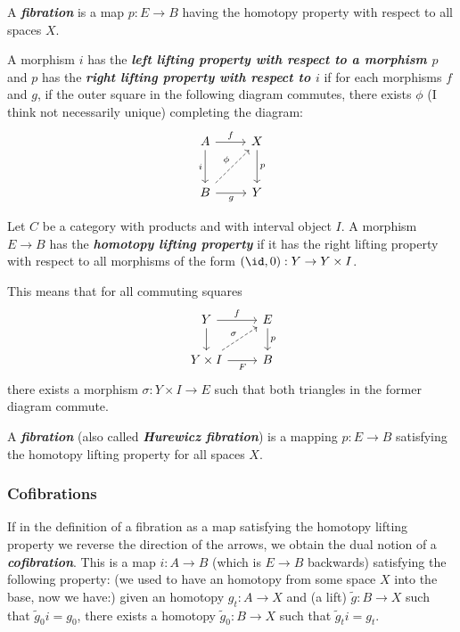 \begin{remark}
\begin{defn}[Hatcher]
	A \textbf{\textit{fibration}} is a map $p:E\to B$ having the homotopy property with respect to all spaces $X$.
\end{defn}

\begin{defn}
	A morphism $i$ has the \textbf{\textit{left lifting property with respect to a morphism $p$}} and $p$ has the \textbf{\textit{right lifting property with respect to $i$}} if for each morphisms $f$ and $g$, if the outer square in the following diagram commutes, there exists $\phi$ (I think not necessarily unique) completing the diagram:
	\[\begin{tikzcd}[row sep=large]
		A\arrow[r,"f"]\arrow[d,"i",swap]&X\arrow[d,"p"]\\
		B\arrow[r,"g",swap]\arrow[ur,dashed,"\phi"]&Y
	\end{tikzcd}\]
\end{defn}

\begin{defn} Let $C$ be a category with products and with interval object $I$. A morphism $E\to B$ has the \textbf{\textit{homotopy lifting property}} if it has the right lifting property with respect to all morphisms of the form $(\id,0):Y\to Y\times I$.
	
	This means that for all commuting squares
	\[\begin{tikzcd}
		Y\arrow[r,"f"]\arrow[d]&E\arrow[d,"p"]\\
		Y\times I\arrow[r,swap,"F"]\arrow[ur,dashed,"\sigma"]&B
	\end{tikzcd}\]
	there exists a morphism $\sigma:Y\times I\to E$ such that both triangles in the former diagram commute.
	
	A \textbf{\textit{fibration}} (also called \textbf{\textit{Hurewicz fibration}}) is a mapping $p:E\to B$ satisfying the homotopy lifting property for all spaces $X$.
\end{defn}

\subsubsection{Cofibrations}

\begin{defn}[Hatcher]
	If in the definition of a fibration as a map satisfying the homotopy lifting property we reverse the direction of the arrows, we obtain the dual notion of a \textit{\textbf{cofibration}}. This is a map $i:A\to B$ {\color{persimmon}(which is $E\to B$ backwards)} satisfying the following property: {\color{persimmon}(we used to have an homotopy from some space $X$ into the base, now we have:)} given an homotopy $g_{t}:A\to X$ and {\color{persimmon}(a lift)}  $\tilde{g}:B\to X$ such that $\tilde{g}_{0}i=g_{0}$, there exists a homotopy $\tilde{g}_{0}:B\to X$ such that $\tilde{g}_{t}i=g_{t}$.


\end{defn}
\end{remark}
